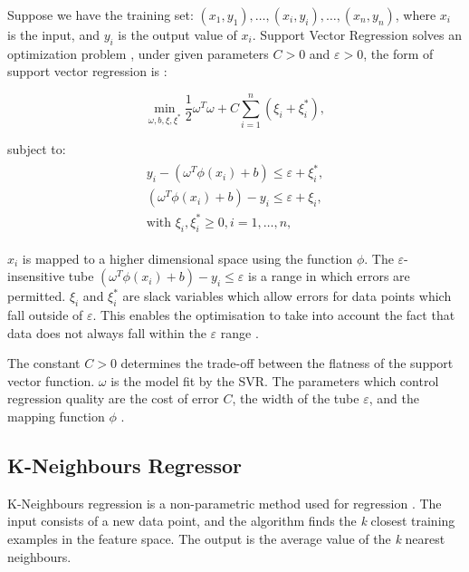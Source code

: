 Suppose we have the training set: $(x_1,y_1), \ldots,(x_i,y_i),\ldots,(x_n,y_n)$, where $x_i$ is the input, and $y_i$ is the output value of $x_i$. Support Vector Regression solves an optimization problem \cite{Chen2004, Shu2006}, under given parameters $C>0$ and $\varepsilon >0$, the form of support vector regression is \cite{Drucker1997}: 

\begin{equation}
\min_{\omega,b,\xi,\xi^{*}}\frac{1}{2}\omega^T\omega+C\sum_{i=1}^{n}(\xi_i+\xi_i^*),
\end{equation}

\noindent subject to:
\begin{align}
\begin{multlined}
\label{svr:constrains}
y_i-(\omega^T\phi(x_i)+b)\leq\varepsilon+\xi_i^{*},\\
(\omega^T\phi(x_i)+b)-y_i\leq\varepsilon+\xi_i,\\
\text{with }\xi_i,\xi^*_i\geq0,i=1,\ldots,n,
\end{multlined}
\end{align}

\noindent $x_i$ is mapped to a higher dimensional space using the function $\phi$. The $\varepsilon$-insensitive tube $(\omega^T\phi(x_i)+b)-y_i\leq\varepsilon$ is a range in which errors are permitted. $\xi_i$ and $\xi^*_i$ are slack variables which allow errors for data points which fall outside of $\varepsilon$. This enables the optimisation to take into account the fact that data does not always fall within the $\varepsilon$ range \cite{Smola2004}.

The constant $C>0$ determines the trade-off between the flatness of the support vector function. $\omega$ is the model fit by the SVR. The parameters which control regression quality are the cost of error $C$, the width of the tube $\varepsilon$, and the mapping function $\phi$ \cite{Chen2004, Shu2006}. 


\subsection{K-Neighbours Regressor}

K-Neighbours regression is a non-parametric method used for regression \cite{forgy65}. The input consists of a new data point, and the algorithm finds the \textit{k} closest training examples in the feature space. The output is the average value of the \textit{k} nearest neighbours.



